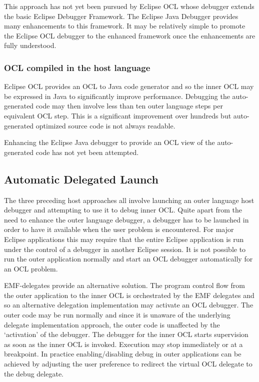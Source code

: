 \documentclass[a4paper]{article}
\begin{document}
This approach has not yet been pursued by Eclipse OCL whose debugger extends the basic Eclipse Debugger Framework. The Eclipse Java Debugger provides many enhancements to this framework. It may be relatively simple to promote the Eclipse OCL debugger to the enhanced framework once the enhancements are fully understood. 

\subsubsection{OCL compiled in the host language}

Eclipse OCL provides an OCL to Java code generator and so the inner OCL may be expressed in Java to significantly improve performance. Debugging the auto-generated code may then involve less than ten outer language steps per equivalent OCL step. This is a significant improvement over hundreds but auto-generated optimized source code is not always readable.

Enhancing the Eclipse Java debugger to provide an OCL view of the auto-generated code has not yet been attempted.

\subsection{Automatic Delegated Launch}

The three preceding host approaches all involve launching an outer language host debugger and attempting to use it to debug inner OCL. Quite apart from the need to enhance the outer language debugger, a debugger has to be launched in order to have it available when the user problem is encountered. For major Eclipse applications this may require that the entire Eclipse application is run under the control of a debugger in another Eclipse session. It is not possible to run the outer application normally and start an OCL debugger automatically for an OCL problem.

EMF-delegates provide an alternative solution. The program control flow from the outer application to the inner OCL is orchestrated by the EMF delegates and so an alternative delegation implementation may activate an OCL debugger. The outer code may be run normally and since it is unaware of the underlying delegate implementation approach, the outer code is unaffected by the `activation' of the debugger. The debugger for the inner OCL starts supervision as soon as the inner OCL is invoked. Execution may stop immediately or at a breakpoint. In practice enabling/disabling debug in outer applications can be achieved by adjusting the user preference to redirect the virtual OCL delegate to the debug delegate.
\end{document}
